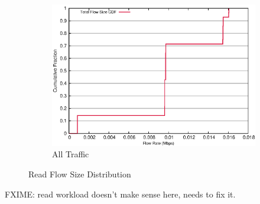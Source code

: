 \begin{figure}[!ht]
\begin{subfigure}[b]{.75\linewidth}
	\includegraphics[width=.99\textwidth]{figures/4read/flow_size.eps}
	\caption{All Traffic}\label{fig:read_size:all}
   \end{subfigure}%
\caption{Read Flow Size Distribution}
\end{figure}

FXIME: read workload doesn't make sense here, needs to fix it.


